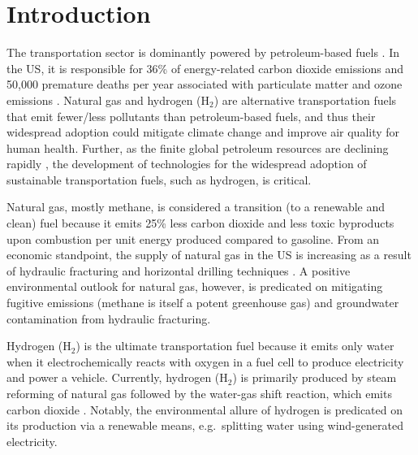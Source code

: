 \section{Introduction}
The transportation sector is dominantly powered by petroleum-based fuels \cite{davis2009transportation}. In the US, it is responsible for 36\% of energy-related carbon dioxide emissions \cite{useia} and 50,000 premature deaths per year associated with particulate matter and ozone emissions \cite{caiazzo2013air}. 
Natural gas and hydrogen (H$_2$) are alternative transportation fuels that emit fewer/less pollutants 
than petroleum-based fuels, and thus their widespread adoption could mitigate climate change 
\cite{mcglade2015geographical} and improve air quality for human health. Further, as the finite global 
petroleum resources are declining rapidly \cite{sorrell2010global}, the development of technologies for the widespread
adoption of sustainable transportation fuels, such as hydrogen, is critical.

Natural gas, mostly methane, is considered a transition (to a renewable and clean) fuel because 
it emits 25\% less carbon dioxide \cite{eia2013much} and less toxic 
byproducts \cite{wang2000full} upon combustion per unit energy produced compared to gasoline. From an 
economic standpoint, the supply of natural gas in the US is increasing as a result of hydraulic 
fracturing and horizontal drilling techniques \cite{usnatgassupply}. A positive environmental outlook 
for natural gas, however, is predicated on mitigating fugitive emissions (methane is itself a potent 
greenhouse gas) \cite{alvarez2012greater} and groundwater contamination \cite{osborn2011methane}
from hydraulic fracturing.

Hydrogen (H$_2$) is the ultimate transportation fuel because it emits only water when it electrochemically reacts with oxygen in a fuel cell to produce electricity and power a vehicle.
Currently, hydrogen (H$_2$) is primarily produced by steam reforming of natural gas followed by the
water-gas shift reaction, which emits carbon dioxide \cite{crabtree2004hydrogen}. Notably, the 
environmental allure of hydrogen is predicated on its production via a renewable means, e.g.\ splitting
water using wind-generated electricity.

